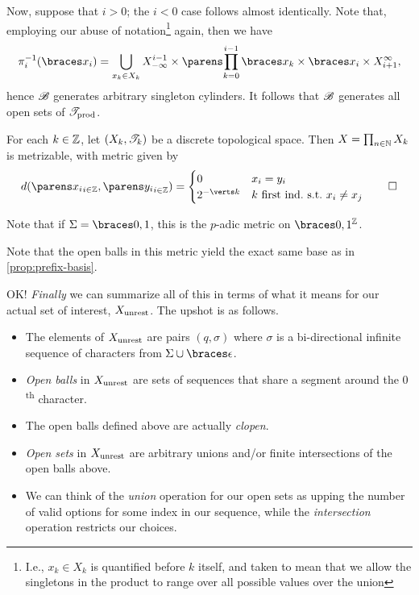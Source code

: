 \documentclass{fkpaper}
\begin{document}
\begin{multicols}{2}
\begin{sproof}
  Now, suppose that $i > 0$; the $i < 0$ case follows almost
  identically. Note that, employing our abuse of
  notation\footnote{I.e., $x_k \in X_k$ is quantified before $k$
    itself, and taken to mean that we allow the singletons in the
    product to range over all possible values over the union} again,
  then we have
  \[
    \pi_{i}^{-1}(\set{x_i}) = \bigcup_{x_k \in X_k} X_{-\infty}^{i -
      1} \times \pn{\prod_{k=0}^{i-1} \set{x_k}} \times \set{x_i}
    \times X_{i+1}^{\infty},
  \]
  hence ${\mathscr{B}}$ generates arbitrary singleton cylinders. It follows
  that ${\mathscr{B}}$ generates all open sets of ${\mathscr{T}}_{\rm prod}$.
\end{sproof}



\begin{proposition}\label{prop:product-metrizable}%
  For each $k \in \mathbb{Z}$, let $(X_k, {\mathscr{T}}_k)$ be a discrete topological
  space. Then $X = \prod_{n\in\mathbb{N}} X_k$ is metrizable, with metric
  given by
  \[
    d(\pn{x_i}_{i \in \ZZ}, \pn{y_i}_{i \in \ZZ}) =
    \begin{cases}
      0 & x_i = y_i \\
      2^{-\abs{k}} & k \textnormal{ first ind.\ s.t.\ } x_i \neq x_j
    \end{cases} \qedhere
  \]
\end{proposition}
\begin{remark}
  Note that if $\Sigma = \set{0,1}$, this is the $p$-adic metric on
  $\set{0,1}^{\ZZ}$.
\end{remark}
\begin{sproof}
  Note that the open balls in this metric yield the exact same base as
  in \cref{prop:prefix-basis}.
\end{sproof}
OK! \emph{Finally} we can summarize all of this in terms of what it
means for our actual set of interest, $X_{\rm unrest}$. The upshot is
as follows.
\begin{itemize}
  \item The elements of $X_{\rm unrest}$ are pairs $(q, \sigma)$ where
    $\sigma$ is a bi-directional infinite sequence of characters from
    $\Sigma \cup \set{\epsilon}$.
  \item \emph{Open balls} in $X_{\rm unrest}$ are sets of sequences
    that share a segment around the $0$\textsuperscript{th} character.
  \item The open balls defined above are actually \emph{clopen}.
  \item \emph{Open sets} in $X_{\rm unrest}$ are arbitrary unions
    and/or finite intersections of the open balls above.
  \item We can think of the \emph{union} operation for our open sets
    as upping the number of valid options for some index in our
    sequence, while the \emph{intersection} operation restricts our
    choices.
\end{itemize}



\end{multicols}
\end{document}
